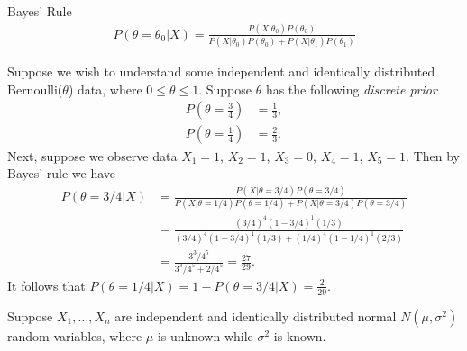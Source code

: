 \begin{defn}{Bayes' Rule}\proofbreak
    \begin{align*}
        P\left(\theta = \theta_0|X\right) = \frac{P\left(X|\theta_0\right)P(\theta_0)}{P\left(X|\theta_0\right)P(\theta_0) + P\left(X|\theta_1\right)P(\theta_1)}
    \end{align*}
\end{defn}

\begin{exmp}
    Suppose we wish to understand some independent and identically distributed Bernoulli($\theta$) data, where $0 \leq \theta \leq 1$. Suppose $\theta$ has the following \emph{discrete prior}
    \begin{align*}
        P\left(\theta = \frac{3}{4}\right) &= \frac{1}{3}, \\
        P\left(\theta = \frac{1}{4}\right) &= \frac{2}{3}.
    \end{align*}
    Next, suppose we observe data $X_1 = 1$, $X_2 = 1$, $X_3 = 0$, $X_4 = 1$, $X_5 = 1$. Then by Bayes' rule we have
    \begin{align*}
        P\left(\theta = 3/4|X\right) &= \frac{P(X|\theta=3/4)P(\theta=3/4)}{P(X|\theta=1/4)P(\theta=1/4) + P(X|\theta=3/4)P(\theta=3/4)} \\
        &= \frac{\left(3/4\right)^{4}(1-3/4)^{1}(1/3)}{\left(3/4\right)^{4}(1-3/4)^{1}(1/3) + \left(1/4\right)^{4}(1-1/4)^{1}(2/3)} \\
        &= \frac{3^3/4^5}{3^3/4^5 + 2/4^5} = \frac{27}{29}.
    \end{align*}
    It follows that $P(\theta = 1/4|X) = 1-P(\theta=3/4|X) = \frac{2}{29}$.
\end{exmp}

\begin{exmp}
    Suppose $X_1, \ldots, X_n$ are independent and identically distributed normal $N(\mu, \sigma^2)$ random variables, where $\mu$ is unknown while $\sigma^2$ is known.
\end{exmp}
